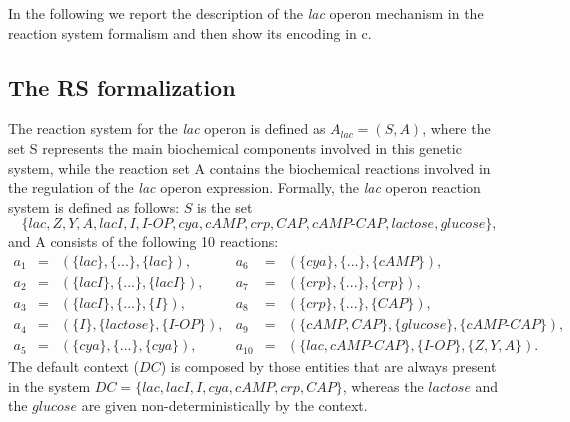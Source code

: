 In the following we report the description of the \emph{lac} operon mechanism in the reaction system formalism
and then show its encoding in c\CNA. 

\subsection{The RS formalization}\label{subsec:RSlacoperon}
The reaction system for the \emph{lac} operon is defined as
$A_{lac} = (S, A)$, where the set S represents
the main biochemical components involved in this genetic system, while the reaction set A contains the biochemical
reactions involved in the regulation of the \emph{lac} operon expression. Formally, the \emph{lac} operon reaction system is defined as
follows:
$S$ is the set
{\small
$$\{lac, Z, Y, A, lacI, I, I\textrm{-}OP, cya, cAMP, crp, CAP,cAMP\textrm{-}CAP, lactose,glucose\},$$
}
and A consists of the following 10 reactions:
{\small
\[
\begin{array}{lcllcl}
a_1 &= &(\{lac\},\{. . .\},\{lac\}), & a_6 &= &(\{cya\},\{. . .\},\{cAMP\}),\\
a_2 &= &(\{lacI\},\{. . .\},\{lacI\}), & a_7 &= &(\{crp\},\{. . .\},\{crp\}),\\
a_3 &= &(\{lacI\},\{. . .\},\{I\}), & a_8 &= &(\{crp\},\{. . .\},\{CAP\}),\\
a_4 &= &(\{I\},\{lactose\},\{I\textrm{-}OP\}), & a_9 &= &(\{cAMP, CAP\},\{glucose\},\{cAMP\textrm{-}CAP\}),\\
a_5 &= &(\{cya\},\{. . .\},\{cya\}),&
a_{10} &=& (\{lac, cAMP\textrm{-}CAP\},\{I\textrm{-}OP\},\{Z, Y, A\}).
\end{array}
\]
}
The default context ($DC$) is composed by those entities that are always present in the system
$DC = \{lac,lacI,I,cya,cAMP,crp,CAP\}$, whereas the $lactose$ and the $glucose$ are given non-deterministically by the context.
